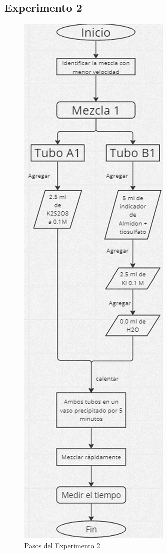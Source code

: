 \documentclass[../main]{subfiles}
\begin{document}
\subsection{Experimento 2}
\begin{figure}[H]
  \begin{center}
    \includegraphics[height=0.5\textheight]{res/flow2.png}
  \end{center}
  \caption{Pasos del Experimento 2}\label{fig:proc2}
\end{figure}
\end{document}
